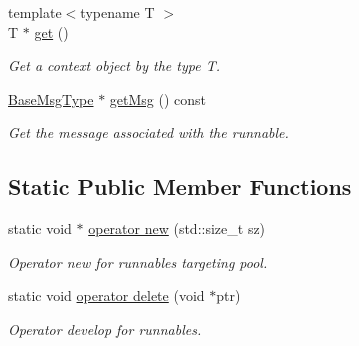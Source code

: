 \begin{DoxyCompactItemize}
{\footnotesize template$<$typename T $>$ }\\T $\ast$ \hyperlink{structvt_1_1runnable_1_1_runnable_new_a140176f3b035d504ad1e726e3c7b09fa}{get} ()
\begin{DoxyCompactList}\small\item\em Get a context object by the type {\ttfamily T}. \end{DoxyCompactList}\item 
\hyperlink{namespacevt_a44d0d4e144748f2b19a1cfd962f50338}{Base\+Msg\+Type} $\ast$ \hyperlink{structvt_1_1runnable_1_1_runnable_new_aed655dff826a821a3db9162259f33288}{get\+Msg} () const
\begin{DoxyCompactList}\small\item\em Get the message associated with the runnable. \end{DoxyCompactList}\end{DoxyCompactItemize}
\subsection*{Static Public Member Functions}
\begin{DoxyCompactItemize}
\item 
static void $\ast$ \hyperlink{structvt_1_1runnable_1_1_runnable_new_a5d8c6436fb1652aa48d9b46798a068e5}{operator new} (std\+::size\+\_\+t sz)
\begin{DoxyCompactList}\small\item\em Operator new for runnables targeting pool. \end{DoxyCompactList}\item 
static void \hyperlink{structvt_1_1runnable_1_1_runnable_new_a1e5a02fffcec8b10eb11666a1e0f4120}{operator delete} (void $\ast$ptr)
\begin{DoxyCompactList}\small\item\em Operator develop for runnables. \end{DoxyCompactList}\end{DoxyCompactItemize}
